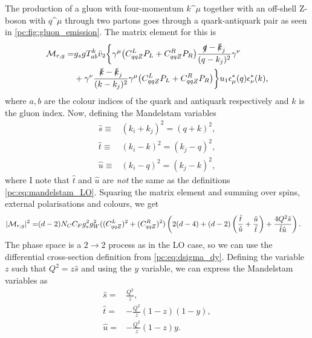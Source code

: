 \documentclass[../main.tex]{subfiles}
\begin{document}
The production of a gluon with four-momentum \(k\^\mu\) together with an off-shell Z-boson with \(q\^\mu\) through two partons goes through a quark-antiquark pair as seen in \cref{pc:fig:gluon_emission}.
The matrix element for this is
\begin{align}
  \nonumber
  \mathcal{M}_{r,g} = & g_s g T_{ab}^k \bar{v}_2 \biggl\{
  \gamma^\mu \bigl(C_{qqZ}^L P_L + C_{qqZ}^R P_R\bigr) \frac{\slashed{q}-\slashed{k}_j}{(q-k_j)^2} \gamma^\nu                \\
             & + \gamma^\nu \frac{\slashed{k}-\slashed{k}_j}{(k-k_j)^2} \gamma^\mu \bigl(C_{qqZ}^L P_L + C_{qqZ}^R P_R\bigr)
  \biggr\} u_1 \epsilon_\mu^\ast(q) \epsilon_\nu^\ast(k),
\end{align}
where \(a,b\) are the colour indices of the quark and antiquark respectively and \(k\) is the gluon index.
Now, defining the Mandelstam variables
\begin{subequations}
  \label{pc:eq:mandelstam_factorised}
  \begin{align}
    \hat{s} \equiv & (k_i+k_j)^2 = (q+k)^2, \\
    \hat{t} \equiv & (k_i-k)^2 = (k_j-q)^2, \\
    \hat{u} \equiv & (k_i-q)^2 = (k_j-k)^2,
  \end{align}
\end{subequations}
where I note that \(\hat{t}\) and \(\hat{u}\) are \emph{not} the same as the definitions \cref{pc:eq:mandelstam_LO}.
Squaring the matrix element and summing over spins, external polarisations and colours, we get
\begin{align}
  |\mathcal{M}_{r,g}|^2 = & (d-2) N_C C_F g_s^2 g_W^2 ((C_{qqZ}^L)^2 + (C_{qqZ}^R)^2) \left(2(d-4) + (d-2)\left(\frac{\hat{t}}{\hat{u}}+\frac{\hat{u}}{\hat{t}}\right) + \frac{4Q^2\hat{s}}{\hat{t}\hat{u}}\right).
\end{align}
The phase space is a \(2\to 2\) process as in the LO case, so we can use the differential cross-section definition from \cref{pc:eq:dsigma_dy}.
Defining the variable \(z\) such that \(Q^2 = z \hat{s}\) and using the \(y\) variable, we can express the Mandelstam variables as
\begin{subequations}
  \begin{align}
    \hat{s} = & \frac{Q^2}{z},            \\
    \hat{t} = & -\frac{Q^2}{z}(1-z)(1-y), \\
    \hat{u} = & -\frac{Q^2}{z} (1-z)y.
  \end{align}
\end{subequations}
\end{document}
